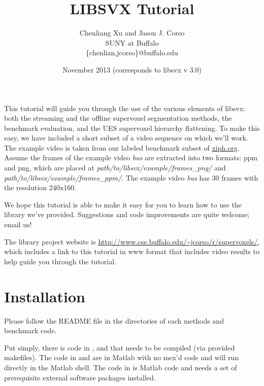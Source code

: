 \documentclass{article}
\begin{document}
\title{LIBSVX Tutorial}
\author{Chenliang Xu and Jason J. Corso\\
SUNY at Buffalo\\
\{chenlian,jcorso\}@buffalo.edu}
\date{November 2013 (corresponds to libsvx v 3.0)}
\maketitle

This tutorial will guide you through the use of the various elements of libsvx: both the streaming and the offline supervoxel segmentation methods, the benchmark evaluation, and the UES supervoxel hierarchy flattening. To make this easy, we have included a short subset of a video sequence on which we'll work. The example video is taken from our labeled benchmark subset of \url{xiph.org}. Assume the frames of the example video \textit{bus} are extracted into two formats: ppm and png, which are placed at \textit{path\slash to\slash libsvx\slash example\slash frames\_png\slash} and \textit{path\slash to\slash libsvx\slash example\slash frames\_ppm\slash}. The example video \textit{bus} has 30 frames with the resolution 240x160.

We hope this tutorial is able to make it easy for you to learn how to use the library we've provided. Suggestions and code improvements are quite welcome; email us!

The library project website is \url{http://www.cse.buffalo.edu/~jcorso/r/supervoxels/}, which includes a link to this tutorial in www format that includes video results to help guide you through the tutorial.

\section{Installation}
Please follow the README file in the directories of each methods and benchmark code.

Put simply, there is code in ,  and  that needs to be compiled (via provided makefiles). The code in  and  are in Matlab with no mex'd code and will run directly in the Matlab shell. The code in  is Matlab code and needs a set of prerequisite external software packages installed.
\end{document}
